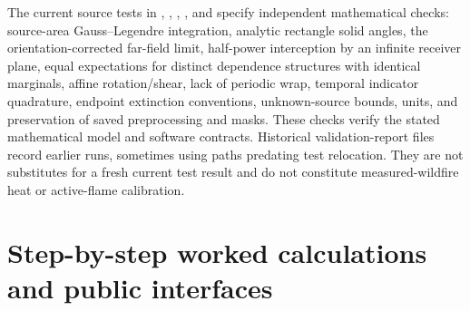 \documentclass[11pt,a4paper]{article}
\begin{document}
The current source tests in ,
, ,
, and
 specify independent mathematical
checks: source-area Gauss--Legendre integration, analytic rectangle solid
angles, the orientation-corrected far-field limit, half-power interception
by an infinite receiver plane, equal expectations for distinct dependence
structures with identical marginals, affine rotation/shear, lack of periodic
wrap, temporal indicator quadrature, endpoint extinction conventions,
unknown-source bounds, units, and preservation of saved preprocessing and
masks. These checks verify the stated mathematical model and software
contracts. Historical validation-report files record earlier runs, sometimes
using paths predating test relocation. They are not substitutes for a fresh
current test result and do not constitute measured-wildfire heat or
active-flame calibration.

\section{Step-by-step worked calculations and public interfaces}
\label{sec:worked}
\end{document}
